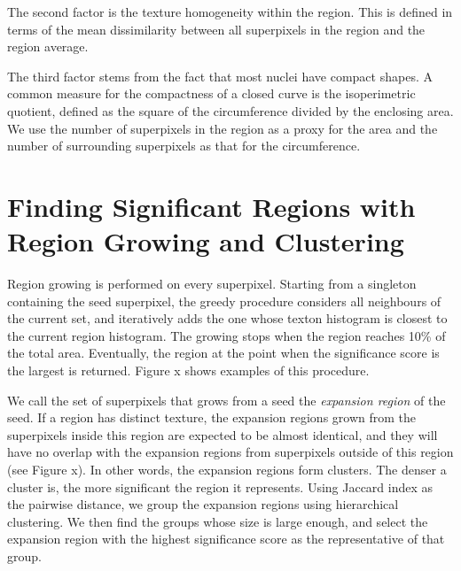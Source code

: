 \documentclass{llncs}
\begin{document}
The second factor is the texture homogeneity within the region. This is defined in terms of the mean dissimilarity between all superpixels in the region and the region average.

The third factor stems from the fact that most nuclei have compact shapes. A common measure for the compactness of a closed curve is the isoperimetric quotient, defined as the square of the circumference divided by the enclosing area. We use the number of superpixels in the region as a proxy for the area and the number of surrounding superpixels as that for the circumference.

\section{Finding Significant Regions with Region Growing and Clustering}

Region growing is performed on every superpixel. Starting from a singleton containing the seed superpixel, the greedy procedure considers all neighbours of the current set, and iteratively adds the one whose texton histogram is closest to the current region histogram. The growing stops when the region reaches 10\% of the total area. Eventually, the region at the point when the significance score is the largest is returned. Figure x shows examples of this procedure.


We call the set of superpixels that grows from a seed the \textit{expansion region} of the seed. If a region has distinct texture, the expansion regions grown from the superpixels inside this region are expected to be almost identical, and they will have no overlap with the expansion regions from superpixels outside of this region (see Figure x). In other words, the expansion regions form clusters. The denser a cluster is, the more significant the region it represents. Using Jaccard index as the pairwise distance, we group the expansion regions using hierarchical clustering. We then find the groups whose size is large enough, and select the expansion region with the highest significance score as the representative of that group.
\end{document}
